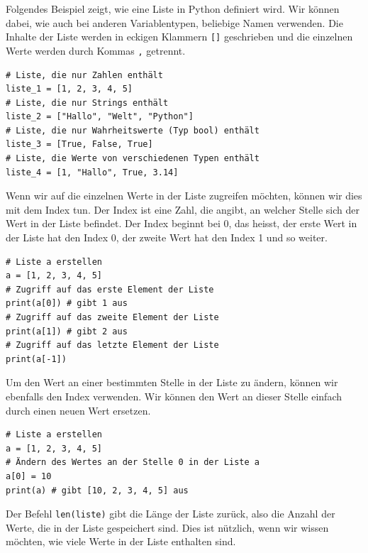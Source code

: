 \begin{myexample}
	Folgendes Beispiel zeigt, wie eine Liste in Python definiert wird. Wir können dabei, wie auch bei anderen Variablentypen, beliebige Namen verwenden. Die Inhalte der Liste werden in eckigen Klammern \lstinline|[]| geschrieben und die einzelnen Werte werden durch Kommas \lstinline|,| getrennt.
	\begin{lstlisting}
# Liste, die nur Zahlen enthält 
liste_1 = [1, 2, 3, 4, 5]
# Liste, die nur Strings enthält
liste_2 = ["Hallo", "Welt", "Python"]
# Liste, die nur Wahrheitswerte (Typ bool) enthält
liste_3 = [True, False, True]
# Liste, die Werte von verschiedenen Typen enthält
liste_4 = [1, "Hallo", True, 3.14]
\end{lstlisting}
\end{myexample}
\begin{myexample}
	Wenn wir auf die einzelnen Werte in der Liste zugreifen möchten, können wir dies mit dem Index tun. Der Index ist eine Zahl, die angibt, an welcher Stelle sich der Wert in der Liste befindet. Der Index beginnt bei 0, das heisst, der erste Wert in der Liste hat den Index 0, der zweite Wert hat den Index 1 und so weiter.
	\begin{lstlisting}
# Liste a erstellen
a = [1, 2, 3, 4, 5]
# Zugriff auf das erste Element der Liste
print(a[0]) # gibt 1 aus
# Zugriff auf das zweite Element der Liste
print(a[1]) # gibt 2 aus
# Zugriff auf das letzte Element der Liste
print(a[-1])
\end{lstlisting}
\end{myexample}
\begin{myexample}
	Um den Wert an einer bestimmten Stelle in der Liste zu ändern, können wir ebenfalls den Index verwenden. Wir können den Wert an dieser Stelle einfach durch einen neuen Wert ersetzen.
	\begin{lstlisting}
# Liste a erstellen
a = [1, 2, 3, 4, 5]
# Ändern des Wertes an der Stelle 0 in der Liste a
a[0] = 10
print(a) # gibt [10, 2, 3, 4, 5] aus
\end{lstlisting}
\end{myexample}
\begin{myexample}
	Der Befehl \lstinline|len(liste)| gibt die Länge der Liste zurück, also die Anzahl der Werte, die in der Liste gespeichert sind. Dies ist nützlich, wenn wir wissen möchten, wie viele Werte in der Liste enthalten sind.
\end{myexample}

